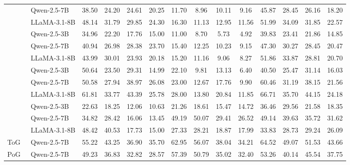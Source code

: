 \begin{table}[t!]
{\begin{tabular}{ll*{12}{c}}
        \rowcolor{promptbg}
        & Qwen-2.5-7B & 38.50 & 24.20 & 24.61 & 20.25 & 11.70 & 8.96 & 10.11 & 9.16 & 45.87 & 28.45 & 26.16 & 18.20 \\
        \rowcolor{promptbg} \multirow{-3}{*}{IO} & LLaMA-3.1-8B & 48.14 & 31.79 & 29.85 & 24.30 & 16.30 & 11.13 & 12.95 & 11.56 & 51.99 & 34.09 & 31.85 & 22.57 \\
        \midrule
        \rowcolor{promptbg}
        & Qwen-2.5-3B & 34.96 & 22.20 & 17.76 & 15.00 & 11.00 & 8.70 & 5.73 & 4.92 & 39.83 & 23.41 & 21.86 & 14.85 \\
        \rowcolor{promptbg}
        & Qwen-2.5-7B & 40.94 & 26.98 & 28.38 & 23.70 & 15.40 & 12.25 & 10.23 & 9.15 & 47.30 & 30.27 & 28.45 & 20.47 \\
        \rowcolor{promptbg} \multirow{-3}{*}{CoT~\citep{CoT}} & LLaMA-3.1-8B & 43.99 & 30.01 & 23.93 & 20.18 & 15.20 & 11.16 & 9.06 & 8.27 & 51.86 & 33.87 & 28.81 & 20.70 \\
        \midrule
        \rowcolor{promptbg}
        & Qwen-2.5-3B & 50.64 & 23.50 & 29.31 & 14.99 & 22.10 & 9.81 & 13.13 & 6.40 & 40.50 & 25.47 & 31.14 & 16.03 \\
        \rowcolor{promptbg}
        & Qwen-2.5-7B & 50.58 & 27.94 & 38.97 & 26.08 & 23.00 & 12.67 & 17.76 & 9.90 & 60.46 & 31.19 & 38.15 & 21.56 \\
        \rowcolor{promptbg} \multirow{-3}{*}{SC~\citep{Self-Consistency}} & LLaMA-3.1-8B & 61.81 & 33.77 & 43.39 & 25.78 & 28.00 & 13.80 & 20.84 & 11.85 & 66.71 & 35.70 & 44.15 & 24.18 \\
        \midrule
        \rowcolor{agentbg}
        & Qwen-2.5-3B & 22.63 & 18.25 & 12.06 & 10.63 & 21.26 & 18.61 & 15.47 & 14.72 & 36.46 & 29.56 & 21.58 & 18.35 \\
        \rowcolor{agentbg}
        & Qwen-2.5-7B & 34.82 & 28.42 & 16.06 & 13.45 & 49.19 & 50.07 & 29.41 & 26.52 & 49.14 & 39.63 & 35.72 & 31.62 \\
        \rowcolor{agentbg} \multirow{-3}{*}{ReAct~\citep{React}} & LLaMA-3.1-8B & 48.42 & 40.53 & 17.73 & 15.00 & 27.33 & 28.21 & 18.87 & 17.99 & 33.83 & 28.73 & 29.24 & 26.09 \\
        \midrule
        \rowcolor{agentbg}
        ToG~\citep{ToG} & Qwen-2.5-7B & 55.22 & 43.25 & 36.90 & 35.70 & 62.95 & 56.07 & 38.04 & 34.21 & 64.52 & 49.07 & 51.53 & 43.66 \\
        \rowcolor{agentbg}
        PoG~\citep{PoG} & Qwen-2.5-7B & 49.23 & 36.83 & 32.82 & 28.57 & 57.39 & 50.79 & 35.02 & 32.40 & 53.26 & 40.14 & 45.54 & 37.75 \\

\end{tabular}}
\end{table}
